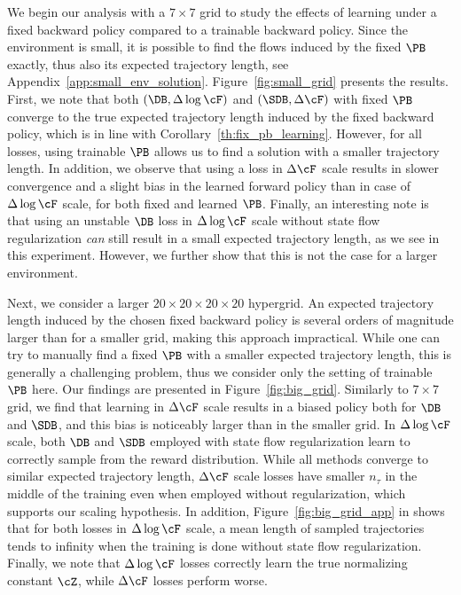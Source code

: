We begin our analysis with a $7 \times 7$ grid to study the effects of learning under a fixed backward policy compared to a trainable backward policy. Since the environment is small, it is possible to find the flows induced by the fixed $\PB$ exactly, thus also its expected trajectory length, see Appendix~\ref{app:small_env_solution}. Figure~\ref{fig:small_grid} presents the results. First, we note that both $(\DB, \Delta \log \cF)$ and $(\SDB, \Delta \cF)$ with fixed $\PB$ converge to the true expected trajectory length induced by the fixed backward policy, which is in line with Corollary~\ref{th:fix_pb_learning}. However, for all losses, using trainable $\PB$ allows us to find a solution with a smaller trajectory length. In addition, we observe that using a loss in $\Delta \cF$ scale results in slower convergence and a slight bias in the learned forward policy than in case of $\Delta \log \cF$ scale, for both fixed and learned $\PB$. Finally, an interesting note is that using an unstable $\DB$ loss in $\Delta \log \cF$ scale without state flow regularization \textit{can} still result in a small expected trajectory length, as we see in this experiment. However, we further show that this is not the case for a larger environment.

Next, we consider a larger $20 \times 20 \times 20 \times 20$ hypergrid. An expected trajectory length induced by the chosen fixed backward policy is several orders of magnitude larger than for a smaller grid, making this approach impractical. While one can try to manually find a fixed $\PB$ with a smaller expected trajectory length, this is generally a challenging problem, thus we consider only the setting of trainable $\PB$ here. Our findings are presented in Figure~\ref{fig:big_grid}. Similarly to $7 \times 7$ grid, we find that learning in $\Delta \cF$ scale results in a biased policy both for $\DB$ and $\SDB$, and this bias is noticeably larger than in the smaller grid. In $\Delta \log \cF$ scale, both $\DB$ and $\SDB$ employed with state flow regularization learn to correctly sample from the reward distribution. While all methods converge to similar expected trajectory length, $\Delta \cF$ scale losses have smaller $n_\tau$ in the middle of the training even when employed without regularization, which supports our scaling hypothesis. In addition, Figure~\ref{fig:big_grid_app} in  shows that for both losses in $\Delta \log \cF$ scale, a mean length of sampled trajectories tends to infinity when the training is done without state flow regularization. Finally, we note that $\Delta \log \cF$ losses correctly learn the true normalizing constant $\cZ$, while $\Delta \cF$ losses perform worse.
 

